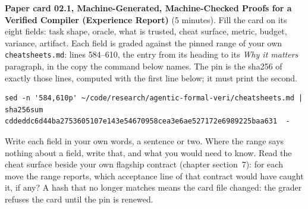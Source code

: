 \documentclass[11pt]{article}
\begin{document}
\begin{problem}\label{prob:B3}
\textbf{Paper card 02.1, Machine-Generated, Machine-Checked Proofs for a
Verified Compiler (Experience Report)} (5 minutes). Fill the card on its eight
fields: task shape, oracle, what is trusted, cheat surface, metric, budget,
variance, artifact. Each field is graded against the pinned range of your own
\texttt{cheatsheets.md}: lines 584--610, the entry from its heading to its
\emph{Why it matters} paragraph, in the copy the command below names. The pin
is the sha256 of exactly those lines, computed with the first line below; it
must print the second.
{\small
\begin{verbatim}
sed -n '584,610p' ~/code/research/agentic-formal-veri/cheatsheets.md | sha256sum
cddeddc6d44ba2753605107e143e54670958cea3e6ae527172e6989225baa631  -
\end{verbatim}
}
Write each field in your own words, a sentence or two. Where the range says
nothing about a field, write that, and what you would need to know. Read the
cheat surface beside your own flagship contract (chapter section~7): for each
move the range reports, which acceptance line of that contract would have
caught it, if any? A hash that no longer matches means the card file changed:
the grader refuses the card until the pin is renewed.
\end{problem}
\end{document}
